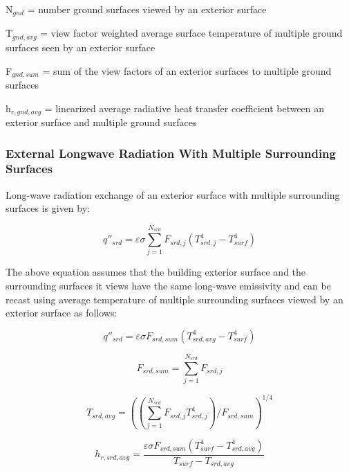 N\(_{gnd}\) = number ground surfaces viewed by an exterior surface

T\(_{gnd,avg}\) = view factor weighted average surface temperature of multiple ground surfaces seen by an exterior surface

F\(_{gnd,sum}\) = sum of the view factors of an exterior surfaces to multiple ground surfaces

h\(_{r,gnd,avg}\) = linearized average radiative heat transfer coefficient between an exterior surface and multiple ground surfaces


\subsubsection{External Longwave Radiation With Multiple Surrounding Surfaces}\label{external-longwave-radiation-with-multiple-surrounding-surfaces}

Long-wave radiation exchange of an exterior surface with multiple surrounding surfaces is given by:

\begin{equation}
{q''_{srd}} = \varepsilon \sigma \sum\limits_{j = 1}^{{N_{srd}}} {F_{srd,j}} \left(T_{srd,j}^4 - T_{surf}^4 \right)
\end{equation}

The above equation assumes that the building exterior surface and the surrounding surfaces it views have the same long-wave emissivity and can be recast using average temperature of multiple surrounding surfaces viewed by an exterior surface as follows:

\begin{equation}
{q''_{srd}} = \varepsilon \sigma {F_{srd,sum}} (T_{srd,avg}^4 - T_{surf}^4)
\end{equation}

\begin{equation}
{F_{srd,sum}} = \sum\limits_{j = 1}^{{N_{srd}}} {F_{srd,j}}
\end{equation}

\begin{equation}
{T_{srd,avg}} = ((\sum\limits_{j = 1}^{{N_{srd}}} {F_{srd,j}} {T_{srd,j}^4}) / {F_{srd,sum}})^{1/4}
\end{equation}

\begin{equation}
{h_{r,srd,avg}} = \frac{{\varepsilon \sigma {F_{srd, sum}}(T_{surf}^4 - T_{srd,avg}^4)}}{{{T_{surf}} - {T_{srd,avg}}}}
\end{equation}

